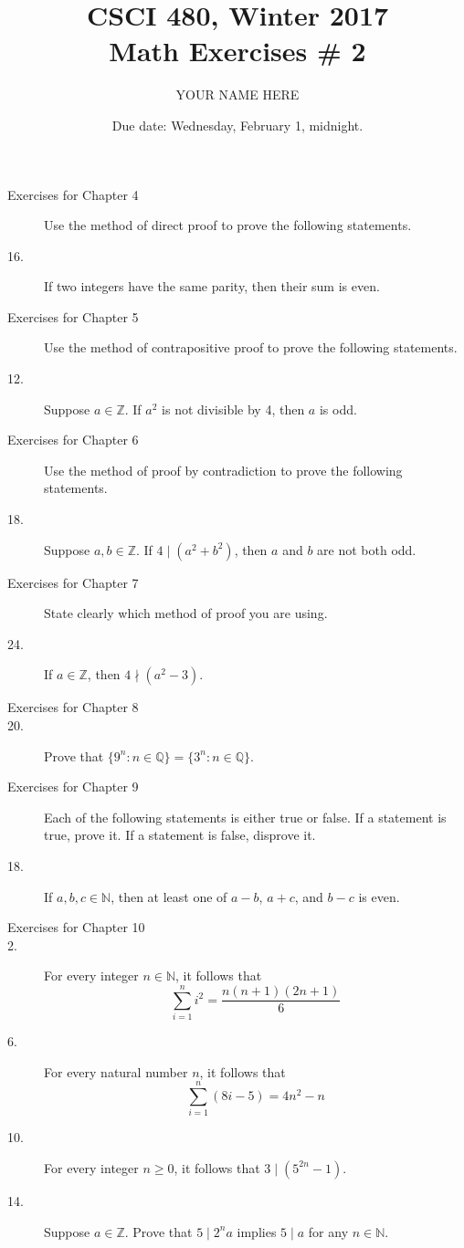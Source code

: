 \documentclass{article}
\title{CSCI 480, Winter 2017\\Math Exercises \# 2}
\author{YOUR NAME HERE}
\date{Due date:  Wednesday, February 1, midnight.}
\begin{document}
\maketitle

\begin{description}
\item[Exercises for Chapter 4]
Use the method of direct proof to prove the following statements.
\item[16.] If two integers have the same parity, then their sum is even.

\item[Exercises for Chapter 5]
Use the method of contrapositive proof to prove the following statements.
\item[12.]  Suppose $a\in\mathbb{Z}$.  If $a^2$ is not divisible by 4,
  then $a$ is odd.


\item[Exercises for Chapter 6]
Use the method of proof by contradiction to prove the following statements.
\item[18.] Suppose $a,b\in\mathbb{Z}$.  If $4\mid (a^2 + b^2)$, then
  $a$ and $b$ are not both odd.

\item[Exercises for Chapter 7]
  State clearly which method of proof you are using.
\item[24.]  If $a\in\mathbb{Z}$, then $4\nmid (a^2-3)$.
  

\item[Exercises for Chapter 8]
\item[20.] Prove that $\{9^n:n\in\mathbb{Q}\}= \{3^n:n\in\mathbb{Q}\}$.  

\item[Exercises for Chapter 9]
  Each of the following statements is either true or false.
  If a statement is true, prove it.
  If a statement is false, disprove it.
\item[18.] If $a,b,c\in\mathbb{N}$, then at least one of $a-b$,
  $a+c$, and $b-c$ is even.

  

\item[Exercises for Chapter 10]
  
\item[2.] For every integer $n\in\mathbb{N}$, it follows that
  \[
  \sum_{i=1}^n i^2 = \frac{n(n+1)(2n+1)}{6}
  \]

\item[6.] For every natural number $n$, it follows that
  \[
  \sum_{i=1}^{n}(8i-5) = 4n^2 - n
  \]

\item[10.] For every integer $n\geq 0$, it follows that $3\mid (5^{2n} - 1)$.


\item[14.]
 Suppose $a\in\mathbb{Z}$.  Prove that $5\mid 2^na$ implies
  $5\mid a$ for any $n\in\mathbb{N}$.

\end{description}
\end{document}
